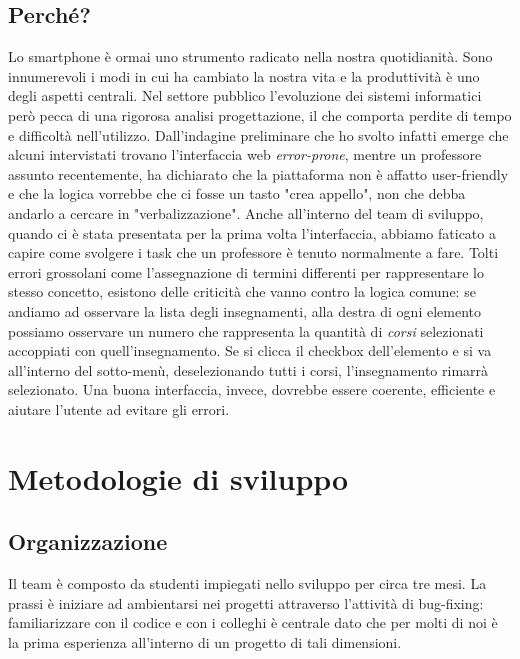 \documentclass[Lau, oneside, noexaminfo]{sapthesis}%
\begin{document}
\section{Perché?}
\label{sec:why}
Lo smartphone è ormai uno strumento radicato nella nostra quotidianità. Sono innumerevoli i modi in cui ha cambiato la nostra vita e la produttività è uno degli aspetti centrali. Nel settore pubblico l'evoluzione dei sistemi informatici però pecca di una rigorosa analisi progettazione, il che comporta perdite di tempo e difficoltà nell'utilizzo. Dall'indagine preliminare che ho svolto infatti emerge che alcuni intervistati trovano l'interfaccia web \textit{error-prone}, mentre un professore assunto recentemente, ha dichiarato che la piattaforma non è affatto user-friendly e che la logica vorrebbe che ci fosse un tasto "crea appello", non che debba andarlo a cercare in "verbalizzazione". Anche all'interno del team di sviluppo, quando ci è stata presentata per la prima volta l'interfaccia, abbiamo faticato a capire come svolgere i task che un professore è tenuto normalmente a fare. Tolti errori grossolani come l'assegnazione di termini differenti per rappresentare lo stesso concetto, esistono delle criticità che vanno contro la logica comune: se andiamo ad osservare la lista degli insegnamenti, alla destra di ogni elemento possiamo osservare un numero che rappresenta la quantità di \textit{corsi} selezionati accoppiati con quell'insegnamento. Se si clicca il checkbox dell'elemento e si va all'interno del sotto-menù, deselezionando tutti i corsi, l'insegnamento rimarrà selezionato. Una buona interfaccia, invece, dovrebbe essere coerente, efficiente e aiutare l'utente ad evitare gli errori.


\chapter{Metodologie di sviluppo}
\label{ch:2}

\section{Organizzazione}
\label{sec:team}
Il team è composto da studenti impiegati nello sviluppo per circa tre mesi. La prassi è iniziare ad ambientarsi nei progetti attraverso l'attività di bug-fixing: familiarizzare con il codice e con i colleghi è centrale dato che per molti di noi è la prima esperienza all'interno di un progetto di tali dimensioni.
\end{document}
